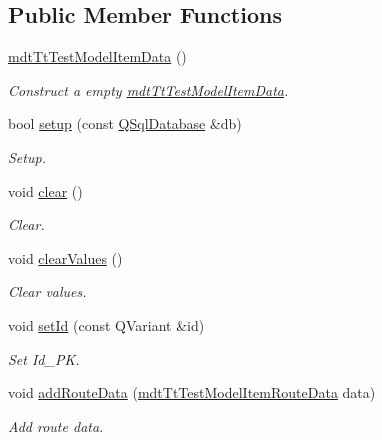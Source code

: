 \subsection*{Public Member Functions}
\begin{DoxyCompactItemize}
\item 
\hyperlink{classmdt_tt_test_model_item_data_a3267e2e1d265a9419aca11f2f40d5cd8}{mdt\-Tt\-Test\-Model\-Item\-Data} ()
\begin{DoxyCompactList}\small\item\em Construct a empty \hyperlink{classmdt_tt_test_model_item_data}{mdt\-Tt\-Test\-Model\-Item\-Data}. \end{DoxyCompactList}\item 
bool \hyperlink{classmdt_tt_test_model_item_data_a531b82928279a22568fdb89aeca3e6b9}{setup} (const \hyperlink{class_q_sql_database}{Q\-Sql\-Database} \&db)
\begin{DoxyCompactList}\small\item\em Setup. \end{DoxyCompactList}\item 
void \hyperlink{classmdt_tt_test_model_item_data_a24b5103634fe894261593dbca443cb6d}{clear} ()
\begin{DoxyCompactList}\small\item\em Clear. \end{DoxyCompactList}\item 
void \hyperlink{classmdt_tt_test_model_item_data_a87655b5eae9d82dd6494ecb4ea26d350}{clear\-Values} ()
\begin{DoxyCompactList}\small\item\em Clear values. \end{DoxyCompactList}\item 
void \hyperlink{classmdt_tt_test_model_item_data_a9c8237673ec651741bef29695720c8d2}{set\-Id} (const Q\-Variant \&id)
\begin{DoxyCompactList}\small\item\em Set Id\-\_\-\-P\-K. \end{DoxyCompactList}\item 
void \hyperlink{classmdt_tt_test_model_item_data_a2c8b517b75e84a41b3d8cd71ca7eb3df}{add\-Route\-Data} (\hyperlink{classmdt_tt_test_model_item_route_data}{mdt\-Tt\-Test\-Model\-Item\-Route\-Data} data)
\begin{DoxyCompactList}\small\item\em Add route data. \end{DoxyCompactList}\item 

\end{DoxyCompactItemize}
